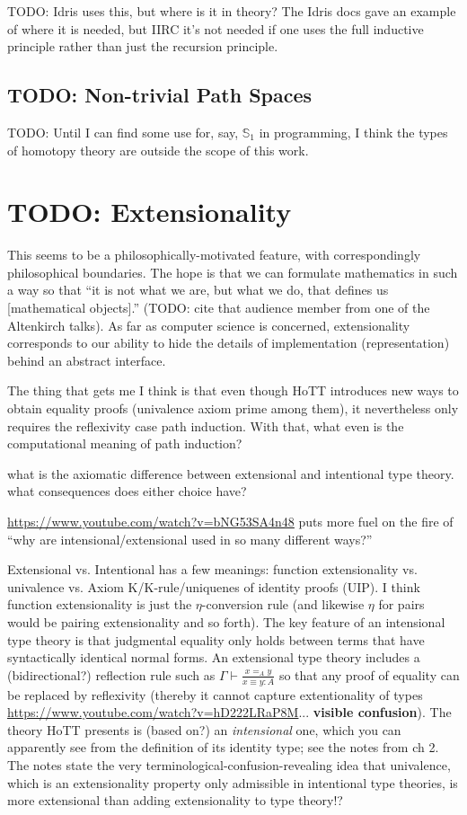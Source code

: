 \documentclass[11pt]{article} %
\theoremstyle{definition}
\theoremstyle{remark}
\begin{document}
TODO: Idris uses this, but where is it in theory?
The Idris docs gave an example of where it is needed, but IIRC it's not needed if one uses the full inductive principle rather than just the recursion principle.

\subsection{TODO: Non-trivial Path Spaces}\label{subsec:fancy-path-spaces}

TODO: Until I can find some use for, say, $\mathbb S_1$ in programming, I think the types of homotopy theory are outside the scope of this work.


\section{TODO: Extensionality}

This seems to be a philosophically-motivated feature, with correspondingly philosophical boundaries.
The hope is that we can formulate mathematics in such a way so that ``it is not what we are, but what we do, that defines us [mathematical objects].'' (TODO: cite that audience member from one of the Altenkirch talks).
As far as computer science is concerned, extensionality corresponds to our ability to hide the details of implementation (representation) behind an abstract interface.

The thing that gets me I think is that even though HoTT introduces new ways to obtain equality proofs (univalence axiom prime among them), it nevertheless only requires the reflexivity case path induction.
With that, what even is the computational meaning of path induction?

what is the axiomatic difference between extensional and intentional type theory. what consequences does either choice have?

\url{https://www.youtube.com/watch?v=bNG53SA4n48} puts more fuel on the fire of ``why are intensional/extensional used in so many different ways?''

Extensional vs. Intentional has a few meanings: function extensionality vs. univalence vs. Axiom K/K-rule/uniquenes of identity proofs (UIP).
I think function extensionality is just the $\eta$-conversion rule (and likewise $\eta$ for pairs would be pairing extensionality and so forth).
The key feature of an intensional type theory is that judgmental equality only holds between terms that have syntactically identical normal forms.
An extensional type theory includes a (bidirectional?) reflection rule such as $\Gamma\vdash\frac{x =_A y}{x \equiv y : A}$
  so that any proof of equality can be replaced by reflexivity (thereby it cannot capture extentionality of types \url{https://www.youtube.com/watch?v=hD222LRaP8M}... \textbf{visible confusion}).
The theory HoTT presents is (based on?) an \emph{intensional} one, which you can apparently see from the definition of its identity type; see the notes from \cite{hottbook} ch 2.
The notes state the very terminological-confusion-revealing idea that univalence, which is an extensionality property only admissible in intentional type theories, is more extensional than adding extensionality to type theory!?
\end{document}
